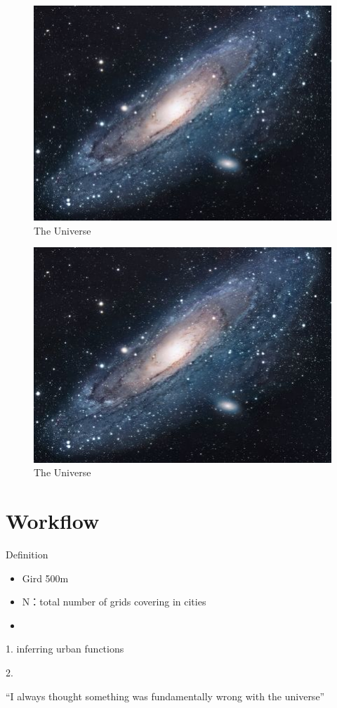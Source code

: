 \documentclass{article}
\begin{document}
\begin{figure}[h!]
\centering
\includegraphics[scale=1.7]{universe}
\caption{The Universe}
\label{fig:universe}
\end{figure}

\begin{figure}[h!]
\centering
\includegraphics[scale=1.7]{universe}
\caption{The Universe}
\label{fig:universe}
\end{figure}

\section{Workflow}

Definition

\begin{itemize}
\item Gird 500m
\item N：total number of grids covering in cities
\item 
\end{itemize}



1. inferring urban functions



2.




``I always thought something was fundamentally wrong with the universe'' \citep{adams1995hitchhiker}



\end{document}

